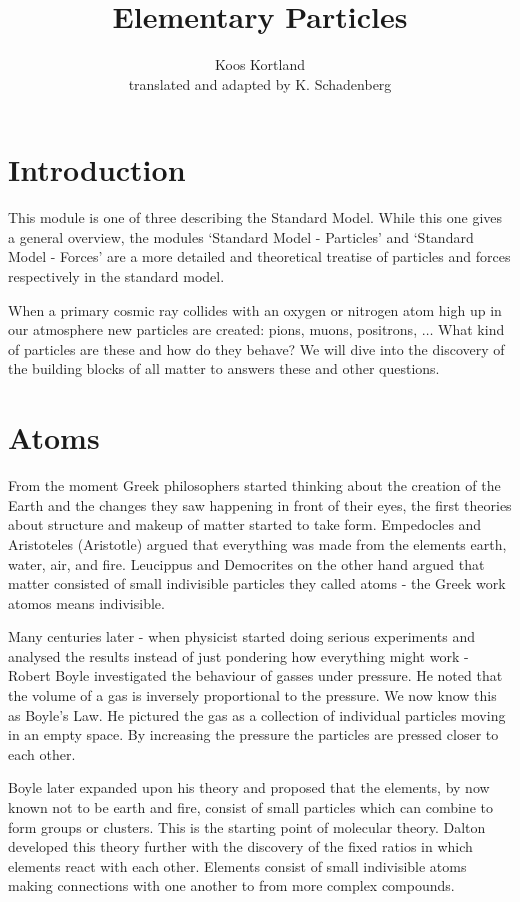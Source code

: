 \documentclass[12pt,a4paper]{article}
\author{Koos Kortland \\ translated and adapted by K. Schadenberg}
\date{}
\title{Elementary Particles}
\numberwithin{equation}{section}
\numberwithin{figure}{section}
\numberwithin{table}{section}
\begin{document}
\maketitle

\section{Introduction}
This module is one of three describing the Standard Model. While this one gives a  general overview, the modules `Standard Model - Particles' and `Standard Model - Forces' are a more detailed and theoretical treatise of particles and forces respectively in the standard model.

When a primary cosmic ray collides with an oxygen or nitrogen atom high up in our atmosphere new particles are created: pions, muons, positrons, $\ldots$ What kind of particles are these and how do they behave? We will dive into the discovery of the building blocks of all matter to answers these and other questions.

\section{Atoms}
From the moment Greek philosophers started thinking about the creation of the Earth and the changes they saw happening in front of their eyes, the first theories about structure and makeup of matter started to take form. Empedocles and Aristoteles (Aristotle) argued that everything was made from the elements earth, water, air, and fire. Leucippus and Democrites on the other hand argued that matter consisted of small indivisible particles they called atoms - the Greek work atomos means indivisible.

Many centuries later - when physicist started doing serious experiments and analysed the results instead of just pondering how everything might work - Robert Boyle investigated the behaviour of gasses under pressure. He noted that the volume of a gas is inversely proportional to the pressure. We now know this as Boyle's Law. He pictured the gas as a collection of individual particles moving in an empty space. By increasing the pressure the particles are pressed closer to each other.

Boyle later expanded upon his theory and proposed that the elements, by now known not to be earth and fire, consist of small particles which can combine to form groups or clusters. This is the starting point of molecular theory. Dalton developed this theory further with the discovery of the fixed ratios in which elements react with each other. Elements consist of small indivisible atoms making connections with one another to from more complex compounds.
\end{document}
